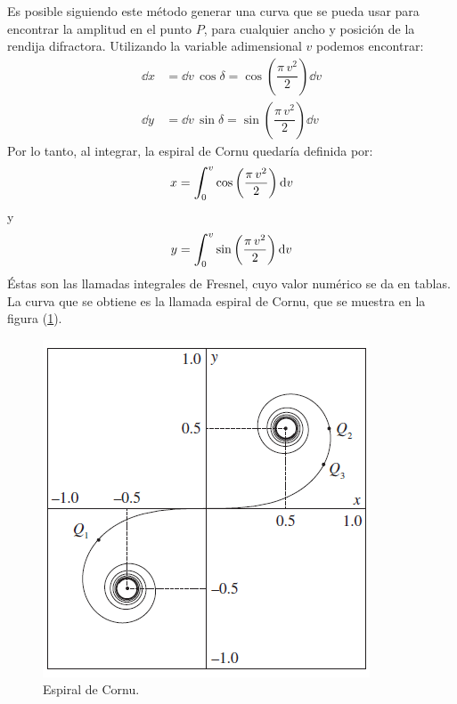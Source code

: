 \documentclass[14pt]{extarticle}
\def\scaleint#1{\vcenter{\hbox{\scaleto[3ex]{\displaystyle\int}{#1}}}}
\def\bs{\mkern-12mu}
\begin{document}
Es posible siguiendo este método generar una curva que se pueda usar para encontrar la amplitud en el punto $P$, para cualquier ancho y posición de la rendija difractora. Utilizando la variable adimensional $v$ podemos encontrar:
\begin{eqnarray}
\dd{x} &= \dd{v} \, \cos \delta = \cos \left( \dfrac{\pi \, v^{2}}{2} \right) \dd{v} \label{eq:ecuacion_X_16} \\[0.5em]
\dd{y} &= \dd{v} \, \sin \delta = \sin \left( \dfrac{\pi \, v^{2}}{2} \right) \dd{v} \label{eq:ecuacion_X_17}
\end{eqnarray}
Por lo tanto, al integrar, la espiral de Cornu quedaría definida por:
\begin{align}
x = \scaleint{6ex}_{\bs 0}^{v} \cos \left( \dfrac{\pi \, v^{2}}{2} \right) \dd{v}
\label{eq:ecuacion_X_18}
\end{align}
y
\begin{align}
y = \scaleint{6ex}_{\bs 0}^{v} \sin \left( \dfrac{\pi \, v^{2}}{2} \right) \dd{v}
\label{eq:ecuacion_X_19}
\end{align}
Éstas son las llamadas integrales de Fresnel, cuyo valor numérico se da en tablas. La curva que se obtiene es la llamada espiral de Cornu, que se muestra en la figura (\ref{fig:figura_X_07}).
\begin{figure}[H]
    \centering
    \includegraphics[scale=1]{Imagenes/Difraccion_07.png}
    \caption{Espiral de Cornu.}
    \label{fig:figura_X_07}
\end{figure}
\end{document}
